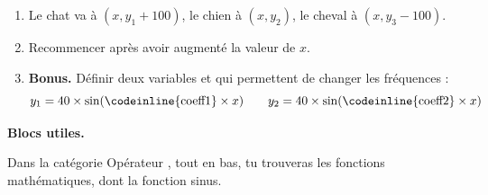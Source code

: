 \documentclass[class=report,crop=false, 12pt]{standalone}
\begin{document}
\begin{activite}
\begin{enumerate}
  \item Le chat va à $(x,y_1+100)$, le chien à $(x,y_2)$, le cheval à $(x,y_3-100)$.
  
  \item Recommencer après avoir augmenté la valeur de $x$.
  
  \item \textbf{Bonus.} Définir deux variables  et  qui permettent de changer les fréquences :
  $$y_1 = 40 \times \sin(\text{\codeinline{coeff1}} \times x)
  \qquad y_2 = 40 \times \sin(\text{\codeinline{coeff2}} \times x)$$ 
  
\end{enumerate}  

\medskip
\textbf{Blocs utiles.}

Dans la catégorie \og Opérateur \fg{}, tout en bas, tu trouveras les fonctions mathématiques, dont la fonction \og sinus\fg{}.

\begin{center}
\end{center}

\end{activite}
\end{document}
